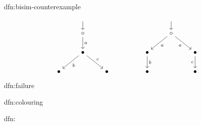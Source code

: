\documentclass[landscape, 8pt]{extarticle}
\begin{document}
\begin{multicols}{3}
\begin{dfn}{dfn:bisim-counterexample}{}
\[\begin{tikzcd}[cramped]
	& {} &&&& {} \\
	& \circ &&&& \circ \\
	& \bullet &&& \bullet && \bullet \\
	\bullet && \bullet && \bullet && \bullet
	\arrow[shorten <=5pt, from=1-2, to=2-2]
	\arrow[shorten <=5pt, from=1-6, to=2-6]
	\arrow["a", from=2-2, to=3-2]
	\arrow["a", from=2-6, to=3-5]
	\arrow["a"', from=2-6, to=3-7]
	\arrow["b", from=3-2, to=4-1]
	\arrow["c", from=3-2, to=4-3]
	\arrow["b", from=3-5, to=4-5]
	\arrow["c"', from=3-7, to=4-7]
\end{tikzcd}\]
\end{dfn}

\begin{dfn}{dfn:failure}{}
    
\end{dfn}


\begin{dfn}{dfn:colouring}{}
    
\end{dfn}

\begin{dfn}[Safety]{dfn:}{}
    
\end{dfn}

\lipsum[1-12]
\end{multicols}
\end{document}
